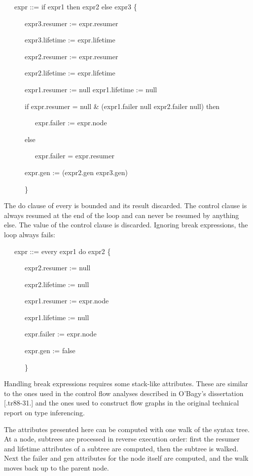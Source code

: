 {\ttfamily\mdseries
\ \ \ expr ::= if expr1 then expr2 else expr3 \{}

{\ttfamily\mdseries
\ \ \ \ \ \ expr3.resumer := expr.resumer}

{\ttfamily\mdseries
\ \ \ \ \ \ expr3.lifetime := expr.lifetime}

{\ttfamily\mdseries
\ \ \ \ \ \ expr2.resumer := expr.resumer}

{\ttfamily\mdseries
\ \ \ \ \ \ expr2.lifetime := expr.lifetime}

{\ttfamily\mdseries
\ \ \ \ \ \ expr1.resumer := null expr1.lifetime := null}

{\ttfamily\mdseries
\ \ \ \ \ \ if expr.resumer = null \& (expr1.failer null {\textbar} expr2.failer null) then}

{\ttfamily\mdseries
\ \ \ \ \ \ \ \ \ expr.failer := expr.node}

{\ttfamily\mdseries
\ \ \ \ \ \ else}

{\ttfamily\mdseries
\ \ \ \ \ \ \ \ \ expr.failer = expr.resumer}

{\ttfamily\mdseries
\ \ \ \ \ \ expr.gen := (expr2.gen {\textbar} expr3.gen)}

{\ttfamily\mdseries
\ \ \ \ \ \ \}}


The do clause of every is bounded and its result discarded. The
control clause is always resumed at the end of the loop and can never
be resumed by anything else. The value of the control clause is
discarded. Ignoring break expressions, the loop always fails:

{\ttfamily\mdseries
\ \ \ expr ::= every expr1 do expr2 \{}

{\ttfamily\mdseries
\ \ \ \ \ \ expr2.resumer := null}

{\ttfamily\mdseries
\ \ \ \ \ \ expr2.lifetime := null}

{\ttfamily\mdseries
\ \ \ \ \ \ expr1.resumer := expr.node}

{\ttfamily\mdseries
\ \ \ \ \ \ expr1.lifetime := null}

{\ttfamily\mdseries
\ \ \ \ \ \ expr.failer := expr.node}

{\ttfamily\mdseries
\ \ \ \ \ \ expr.gen := false}

{\ttfamily\mdseries
\ \ \ \ \ \ \}}


Handling break expressions requires some stack-like attributes. These
are similar to the ones used in the control flow analyses described in
O'Bagy's dissertation [.tr88-31.] and the ones used to construct flow
graphs in the original technical report on type inferencing.

The attributes presented here can be computed with one walk of the
syntax tree. At a node, subtrees are processed in reverse execution
order: first the resumer and lifetime attributes of a subtree are
computed, then the subtree is walked. Next the failer and gen
attributes for the node itself are computed, and the walk moves back
up to the parent node.

\bigskip

\bigskip
